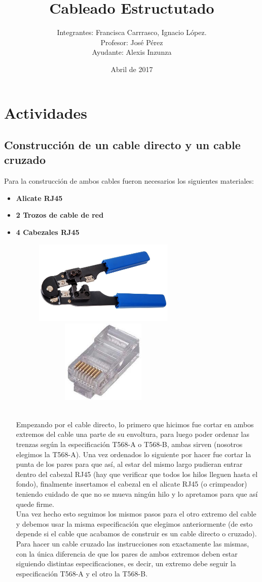 \documentclass{udpreport}
\title{Cableado Estructutado}
\author{Integrantes: Francisca Carrrasco, Ignacio López.\\Profesor: José Pérez
\\Ayudante: Alexis Inzunza}
\date{Abril de 2017}
\begin{document}
\maketitle
\tableofcontents
\chapter{Actividades}
	\section{Construcción de un cable directo y un cable cruzado}
	    Para la construcción de ambos cables fueron necesarios los siguientes materiales: 
\begin{itemize}
		\item{\bf Alicate RJ45}
		\item{\bf 2 Trozos de cable de red}
		\item{\bf 4 Cabezales RJ45}
		\begin{figure}[h]
		    \centering
    	\includegraphics[width=7cm, height=4cm]{alicate.jpg}
    	\includegraphics[width=7cm, height=4cm]{cabezal.jpeg}
    	\end{figure}
    	\\Empezando por el cable directo, lo primero que hicimos fue cortar en ambos extremos del cable una parte de su envoltura, para luego poder ordenar las trenzas según la especificación T568-A o T568-B, ambas sirven (nosotros elegimos la T568-A). Una vez ordenados lo siguiente por hacer fue cortar la punta de los pares para que así, al estar del mismo largo pudieran entrar dentro del cabezal RJ45 (hay que verificar que todos los hilos lleguen hasta el fondo), finalmente insertamos el cabezal en el alicate RJ45 (o crimpeador) teniendo cuidado de que no se mueva ningún hilo y lo apretamos para que así quede firme.
    	\\Una vez hecho esto seguimos los mismos pasos para el otro extremo del cable y debemos usar la misma especificación que elegimos anteriormente (de esto depende si el cable que acabamos de construir es un cable directo o cruzado).
    	\\Para hacer un cable cruzado las instrucciones son exactamente las mismas, con la única diferencia de que los pares de ambos extremos deben estar siguiendo distintas especificaciones, es decir, un extremo debe seguir la especificación T568-A y el otro la T568-B.
\end{itemize}
\end{document}
